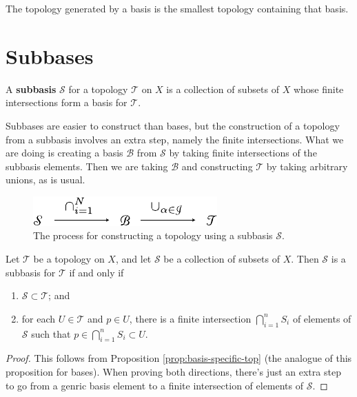 \documentclass[twoside,10pt]{report}
\begin{document}
\begin{prop}
The topology generated by a basis is the smallest topology containing that basis.
\end{prop}


\section{Subbases}

\begin{defn}
	A \textbf{subbasis} $\mathcal{S}$ for a topology $\mathcal{T}$ on $X$ is a collection of subsets of $X$ whose finite intersections form a basis for $\mathcal{T}$.
\end{defn}

Subbases are easier to construct than bases, but the construction of a topology from a subbasis involves an extra step, namely the finite intersections. What we are doing is creating a basis $\mathcal{B}$ from $\mathcal{S}$ by taking finite intersections of the subbasis elements. Then we are taking $\mathcal{B}$ and constructing $\mathcal{T}$ by taking arbitrary unions, as is usual.

\begin{figure}[H]
	\centering
	\includegraphics[scale=1]{fig/subbasis-to-topology.pdf}
	\caption{The process for constructing a topology using a subbasis $\mathcal{S}$.}
\end{figure}

\begin{prop}
Let $\mathcal{T}$ be a topology on $X$, and let $\mathcal{S}$ be a collection of subsets of $X$. Then $\mathcal{S}$ is a subbasis for $\mathcal{T}$ if and only if
\begin{enumerate}
	\item $\mathcal{S} \subset \mathcal{T}$; and
	\item for each $U \in \mathcal{T}$ and $p \in U$, there is a finite intersection $\bigcap_{i=1}^n S_i$ of elements of $\mathcal{S}$ such that $p \in \bigcap_{i=1}^n S_i \subset U$.
\end{enumerate}
\end{prop}
\begin{proof}
	This follows from Proposition \ref{prop:basis-specific-top} (the analogue of this proposition for bases). When proving both directions, there's just an extra step to go from a genric basis element to a finite intersection of elements of $\mathcal{S}$.
\end{proof}
\end{document}

